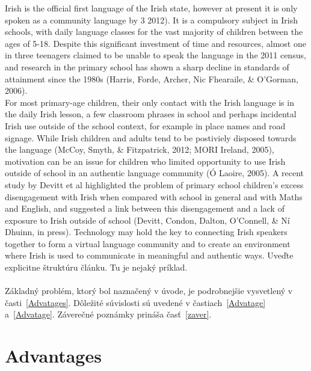 \documentclass[10pt,twoside,english,a4paper]{article}
\begin{document}
Irish is the official first language of the Irish state, however at present it is only spoken as a community language by 3%
2012). It is a compulsory subject in Irish schools, with daily language classes for the vast majority of children between the ages of 5-18. Despite this significant investment
of time and resources, almost one in three teenagers claimed to be unable to speak the language in the 2011 census, and research in the primary school has shown a sharp decline in standards of attainment since the 1980s (Harris, Forde, Archer, Nic Fhearaile, \& O’Gorman, 2006). \\
For most primary-age children, their only contact with the Irish language is in the daily Irish lesson, a few classroom phrases in school and perhaps incidental Irish use outside of the school context, for example in place names and road signage. While Irish children and adults tend to be postiviely disposed towards the language (McCoy, Smyth,  \& Fitzpatrick, 2012; MORI Ireland, 2005), motivation can be an issue for children who limited opportunity to use Irish outside of school in an authentic language community (Ó Laoire, 2005). A recent study by Devitt et al highlighted the problem of primary school children’s excess disengagement with Irish when compared with school in general and with Maths and English, and suggested a link between this disengagement and a lack of exposure to Irish outside of school (Devitt, Condon, Dalton, O’Connell, \& Ní Dhuinn, in press). Technology may hold the key to connecting Irish speakers together to form a virtual language community and to create an environment where Irish is used to communicate in meaningful and authentic ways. Uveďte explicitne štruktúru článku. Tu je nejaký príklad.\\\\
Základný problém, ktorý bol naznačený v úvode, je podrobnejšie vysvetlený v časti~\ref{Advatages}.
Dôležité súvislosti sú uvedené v častiach~\ref{Advatage} a~\ref{Advatage}.
Záverečné poznámky prináša časť~\ref{zaver}.



\section{Advantages} \label{Advantages}
\end{document}
